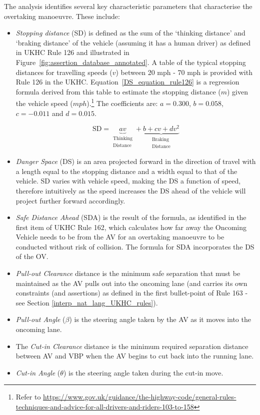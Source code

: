 The analysis identifies several key characteristic parameters that characterise the overtaking manoeuvre. These include:
\begin{itemize}
    \item \emph{Stopping distance} (SD) is defined as the sum of the `thinking distance' and `braking distance' of the vehicle (assuming it has a human driver) as defined in UKHC Rule 126 and illustrated in Figure~\ref{fig:assertion_database_annotated}.
    A table of the typical stopping distances for travelling speeds ($v$) between 20 mph - 70 mph is provided with Rule 126 in the UKHC.
    Equation~\ref{DS_equation_rule126} is a regression formula derived from this table to estimate the stopping distance ($m$) given the vehicle speed ($mph$).\footnote{Refer to \url{https://www.gov.uk/guidance/the-highway-code/general-rules-techniques-and-advice-for-all-drivers-and-riders-103-to-158}} The coefficients are: $a=0.300$, $b=0.058$, $c=-0.011$ and $d=0.015$.
    
\begin{equation} 
\label{DS_equation_rule126}
\text{SD} = \underbrace{av }_{\substack{\text{Thinking} \\ \text{Distance}}} + \underbrace{b + cv + dv^2}_{\substack{\text{Braking} \\ \text{Distance}}}
\end{equation}

    \item \emph{Danger Space} (DS) is an area projected forward in the direction of travel with a length equal to the stopping distance and a width equal to that of the vehicle.
    SD varies with vehicle speed, making the DS a function of speed, therefore intuitively as the speed increases the DS ahead of the vehicle will project further forward accordingly.
    
    \item \emph{Safe Distance Ahead} (SDA) is the result of the formula, as identified in the first item of UKHC Rule 162, which calculates how far away the Oncoming Vehicle needs to be from the AV for an overtaking manoeuvre to be conducted without risk of collision. The formula for SDA incorporates the DS of the OV. 
    
    \item \emph{Pull-out Clearance} distance is the minimum safe separation that must be maintained as the AV pulls out into the oncoming lane (and carries its own constraints (and assertions) as defined in the first bullet-point of Rule 163 - see Section \ref{interp_nat_lang_UKHC_rules}).
    
    \item \emph{Pull-out Angle} ($\beta$) is the steering angle taken by the AV as it moves into the oncoming lane.
    \item The \emph{Cut-in Clearance} distance is the minimum required separation distance between AV and VBP when the AV begins to cut back into the running lane.
    
    \item \emph{Cut-in Angle} ($\theta$) is the steering angle taken during the cut-in move.
\end{itemize}

